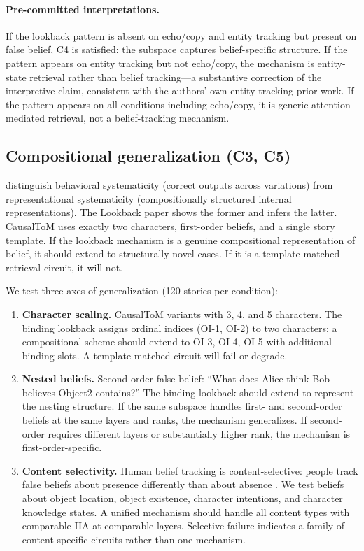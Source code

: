 \documentclass{article}
\begin{document}
\paragraph{Pre-committed interpretations.} If the lookback pattern is absent on echo/copy and entity tracking but present on false belief, C4 is satisfied: the subspace captures belief-specific structure. If the pattern appears on entity tracking but not echo/copy, the mechanism is entity-state retrieval rather than belief tracking---a substantive correction of the interpretive claim, consistent with the authors' own entity-tracking prior work. If the pattern appears on all conditions including echo/copy, it is generic attention-mediated retrieval, not a belief-tracking mechanism.

\subsection{Compositional generalization (C3, C5)}
\label{sec:composition}

\citet{vegner2025systematicity} distinguish behavioral systematicity (correct outputs across variations) from representational systematicity (compositionally structured internal representations). The Lookback paper shows the former and infers the latter. CausalToM uses exactly two characters, first-order beliefs, and a single story template. If the lookback mechanism is a genuine compositional representation of belief, it should extend to structurally novel cases. If it is a template-matched retrieval circuit, it will not.

We test three axes of generalization (120 stories per condition):

\begin{enumerate}
\item \textbf{Character scaling.} CausalToM variants with 3, 4, and 5 characters. The binding lookback assigns ordinal indices (OI-1, OI-2) to two characters; a compositional scheme should extend to OI-3, OI-4, OI-5 with additional binding slots. A template-matched circuit will fail or degrade.
\item \textbf{Nested beliefs.} Second-order false belief: ``What does Alice think Bob believes Object2 contains?'' The binding lookback should extend to represent the nesting structure. If the same subspace handles first- and second-order beliefs at the same layers and ranks, the mechanism generalizes. If second-order requires different layers or substantially higher rank, the mechanism is first-order-specific.
\item \textbf{Content selectivity.} Human belief tracking is content-selective: people track false beliefs about presence differently than about absence \citep{schuwerk2015implicit}. We test beliefs about object location, object existence, character intentions, and character knowledge states. A unified mechanism should handle all content types with comparable IIA at comparable layers. Selective failure indicates a family of content-specific circuits rather than one mechanism.
\end{enumerate}
\end{document}
